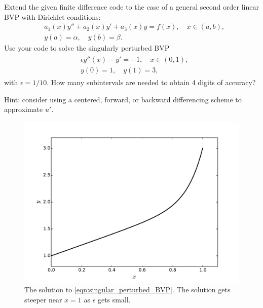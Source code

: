 \begin{problem}
Extend the given finite difference code to the case of a general second order linear BVP with Dirichlet conditions:
\begin{align*}
	&{ } a_1(x)y'' +a_2(x)y'+ a_3(x) y = f(x), \quad x \in (a,b),\\
	&{ } y(a) = \alpha, \quad y(b) = \beta.
\end{align*}
Use your code to solve the singularly perturbed BVP
\begin{align}
	\begin{split}
	&{ } \epsilon y''(x)-y'= -1, \quad x \in (0,1), \\
	&{ } y(0) = 1, \quad y(1) = 3,
	\end{split} \label{eqn:singular_perturbed_BVP}
\end{align}
with $\epsilon = 1/10$.
How many subintervals are needed to obtain 4 digits of accuracy?

Hint: consider using a centered, forward, or backward differencing scheme to approximate $u'$.

\end{problem}

\begin{figure}
\centering
\includegraphics[width=12cm]{figure2.pdf}
\caption{The solution to \eqref{eqn:singular_perturbed_BVP}.
The solution gets steeper near $x = 1$ as $\epsilon $ gets small.}
\end{figure}

